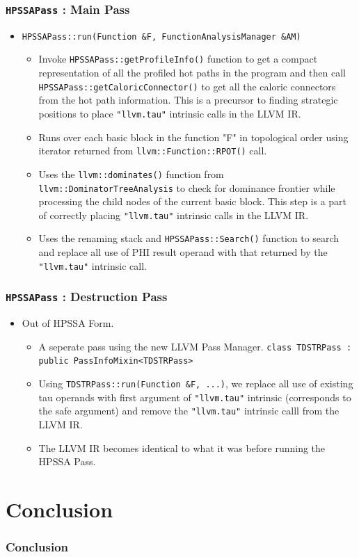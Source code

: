 \documentclass[aspectratio=169]{beamer}
\begin{document}
\begin{frame}
	\frametitle{\texttt{HPSSAPass} : Main Pass}
	\begin{itemize}
		\item \texttt{HPSSAPass::run(Function &F, FunctionAnalysisManager &AM)} 
		\begin{itemize}
			\footnotesize
			\item Invoke \texttt{HPSSAPass::getProfileInfo()} function to get a compact representation of all the profiled \color{red} hot paths \color{black} in the program and then call \texttt{HPSSAPass::getCaloricConnector()} to get all the caloric connectors from the \color{red} hot path \color{black} information. This is a precursor to finding strategic positions to place \texttt{"llvm.tau"} intrinsic calls in the LLVM IR.
			\item Runs over each basic block in the function "F" in topological order using iterator returned from \texttt{llvm::Function::RPOT()} call.
			\item Uses the \texttt{llvm::dominates()} function from \texttt{llvm::DominatorTreeAnalysis} to check for dominance frontier while processing the child nodes of the current basic block. This step is a part of correctly placing \texttt{"llvm.tau"} intrinsic calls in the LLVM IR. 
			\item Uses the renaming stack and \texttt{HPSSAPass::Search()} function to search and replace all use of PHI result operand with that returned by the \texttt{"llvm.tau"} intrinsic call.
		\end{itemize}
	\end{itemize}
\end{frame}

\begin{frame}
	\frametitle{\texttt{HPSSAPass} : Destruction Pass}
	\begin{itemize}
		\item Out of HPSSA Form. 
		\begin{itemize}
			\item A seperate pass using the new LLVM Pass Manager. \texttt{class TDSTRPass : public PassInfoMixin<TDSTRPass>}
			\item Using \texttt{TDSTRPass::run(Function &F, ...)}, we replace all use of existing tau operands with first argument of  \texttt{"llvm.tau"} intrinsic (corresponds to the safe argument) and remove the \texttt{"llvm.tau"} intrinsic calll from the LLVM IR.
			\item The LLVM IR becomes identical to what it was before running the HPSSA Pass. 
		\end{itemize}
	\end{itemize}
\end{frame}

\footnotesize

\section{Conclusion}
\begin{frame}
	\frametitle{Conclusion}
\end{frame}
\footnotesize
\end{document}
